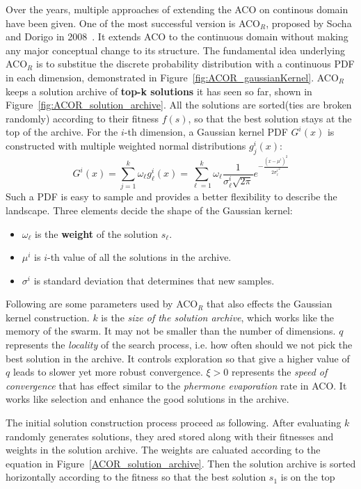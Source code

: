 Over the years, multiple approaches of extending the ACO on continous domain have been given.
One of the most successful version is ACO$_{R}$, proposed by Socha and Dorigo in 2008~\cite{Socha:2008:ACOR}.
It extends ACO to the continuous domain without making any major conceptual change to its structure.
The fundamental idea underlying ACO$_{R}$ is to substitue the discrete probability distribution with a continuous PDF in each dimension, demonstrated in Figure~\ref{fig:ACOR_gaussianKernel}. 
ACO$_R$ keeps a solution archive of \textbf{top-k solutions} it has seen so far, shown in Figure~\ref{fig:ACOR_solution_archive}.
All the solutions are sorted(ties are broken randomly) according to their fitness $f(s)$, 
so that the best solution stays at the top of the archive.
For the $i$-th dimension, a Gaussian kernel PDF $G^i(x)$ is constructed with multiple weighted normal distributions $g_j^i(x)$: 
\begin{displaymath}
G^i(x) = \sum_{j = 1}^{k}\omega_{\ell}g_{\ell}^{i}(x) = 
\sum_{\ell = 1}^{k}\omega_{\ell} \frac{1}{\sigma_{\ell}^{i}\sqrt{2\pi}} e^{-\frac{ (x-\mu^i)^2 }{2 {\sigma^i_\ell}^2}}
\end{displaymath}
Such a PDF is easy to sample and provides a better flexibility to describe the landscape.
Three elements decide the shape of the Gaussian kernel:
\begin{itemize}
\item $\omega_\ell$ is the \textbf{weight} of the solution $s_\ell$.
\item $\mu^i$ is $i$-th value of all the solutions in the archive.
\item $\sigma^i$ is standard deviation that determines that new samples.
\end{itemize}
Following are some parameters used by ACO$_R$ that also effects the Gaussian kernel construction.
$k$ is the \textit{size of the solution archive}, which works like the memory of the swarm.
It may not be smaller than the number of dimensions.
$q$ represents the \textit{locality} of the search process, i.e. how often should we not pick the best solution in the archive.
It controls exploration so that give a higher value of $q$ leads to slower yet more robust convergence.
$\xi > 0$ represents the \textit{speed of convergence} that has effect similar to the \textit{phermone evaporation} rate in ACO.
It works like selection and enhance the good solutions in the archive.

The initial solution construction process proceed as following.
After evaluating $k$ randomly generates solutions, they ared stored along with their fitnesses and weights in the solution archive.
The weights are caluated according to the equation in Figure~\ref{ACOR_solution_archive}.
Then the solution archive is sorted horizontally according to the fitness so that the best solution $s_1$ is on the top


